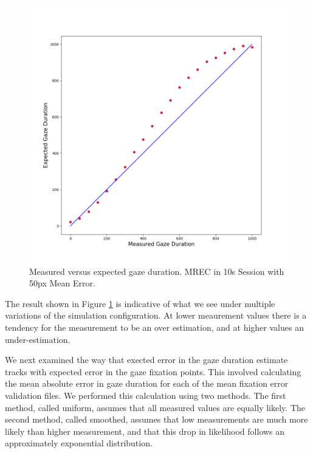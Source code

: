 \documentclass[12pt,a4paper]{article}
\numberwithin{equation}{section}
\begin{document}
\begin{figure}[h!]
\includegraphics[scale=0.5]{../results/Measured_vs_expected.png}
\caption{Measured versus expected gaze duration. MREC in 10s Session with 50px Mean Error.}
\label{fig:measured_vs_expected}
\end{figure}

The result shown in Figure \ref{fig:measured_vs_expected} is indicative of what we see under
multiple variations of the simulation configuration. At lower meaurement values there is a 
tendency for the measurement to be an over estimation, and at higher values an under-estimation.
 
We next examined the way that exected error in the gaze duration estimate tracks with expected 
error in the gaze fixation points. This involved calculating the mean absolute error in gaze
duration for each of the mean fixation error validation files. We performed this calculation
using two methods. The first method, called uniform, assumes that all measured values are 
equally likely. The second method, called smoothed, assumes that low measurements are much
more likely than higher measurement, and that this drop in likelihood follows an approximately
exponential distribution.
\end{document}
